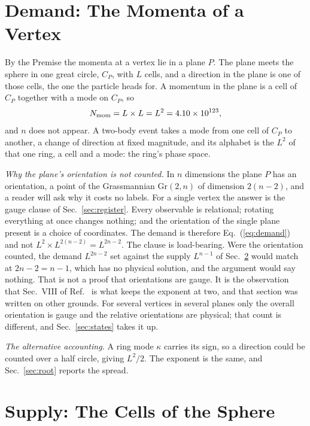 \documentclass[aps,prd,twocolumn,superscriptaddress,nofootinbib]{revtex4-2}
\begin{document}
\section{Demand: The Momenta of a Vertex}
\label{sec:demand}

By the Premise the momenta at a vertex lie in a plane $P$. The plane meets the sphere in one great circle, $C_P$, with $L$ cells, and a direction in the plane is one of those cells, the one the particle heads for. A momentum in the plane is a cell of $C_P$ together with a mode on $C_P$, so
\begin{equation}
N_{\rm mom} = L\times L = L^2 = 4.10\times10^{123},
\label{eq:demand}
\end{equation}
and $n$ does not appear. A two-body event takes a mode from one cell of $C_P$ to another, a change of direction at fixed magnitude, and its alphabet is the $L^2$ of that one ring, a cell and a mode: the ring's phase space.

\textit{Why the plane's orientation is not counted.} In $n$ dimensions the plane $P$ has an orientation, a point of the Grassmannian $\mathrm{Gr}(2,n)$ of dimension $2(n-2)$, and a reader will ask why it costs no labels. For a single vertex the answer is the gauge clause of Sec.~\ref{sec:register}. Every observable is relational; rotating everything at once changes nothing; and the orientation of the single plane present is a choice of coordinates. The demand is therefore Eq.~(\ref{eq:demand}) and not $L^2\times L^{2(n-2)} = L^{2n-2}$. The clause is load-bearing. Were the orientation counted, the demand $L^{2n-2}$ set against the supply $L^{n-1}$ of Sec.~\ref{sec:supply} would match at $2n-2 = n-1$, which has no physical solution, and the argument would say nothing. That is not a proof that orientations are gauge. It is the observation that Sec.~VIII of Ref.~\cite{korytko2026c} is what keeps the exponent at two, and that section was written on other grounds. For several vertices in several planes only the overall orientation is gauge and the relative orientations are physical; that count is different, and Sec.~\ref{sec:states} takes it up.

\textit{The alternative accounting.} A ring mode $\kappa$ carries its sign, so a direction could be counted over a half circle, giving $L^2/2$. The exponent is the same, and Sec.~\ref{sec:root} reports the spread.

\section{Supply: The Cells of the Sphere}
\label{sec:supply}
\end{document}
